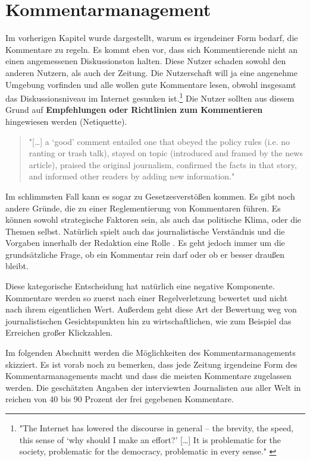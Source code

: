 \chapter{Kommentarmanagement}


Im vorherigen Kapitel wurde dargestellt, warum es irgendeiner Form bedarf, die
Kommentare zu regeln. Es kommt eben vor, dass sich Kommentierende nicht an einen
angemessenen Diskussionston halten. Diese Nutzer schaden sowohl den anderen
Nutzern, als auch der Zeitung. Die Nutzerschaft will ja eine angenehme Umgebung
vorfinden \autocite[S.~217]{meyer-carey} und alle wollen \glqq gute\grqq{}
Kommentare lesen, obwohl insgesamt das Diskussionsniveau im Internet gesunken
ist.\footnote{"The Internet has lowered the discourse in general – the brevity,
the speed, this sense of ‘why should I make an effort?' [\ldots] It is
problematic for the society, problematic for the democracy, problematic in every
sense." \autocite[S.~130]{singer}} Die Nutzer sollten aus diesem Grund auf
{\bfseries Empfehlungen oder Richtlinien zum Kommentieren} hingewiesen werden
(\glqq Netiquette\grqq).


\begin{quote}
"[\ldots] a `good' comment entailed one that obeyed the policy rules (i.e. no
ranting or trash talk), stayed on topic (introduced and framed by the news
article), praised the original journalism, confirmed the facts in that story,
and informed other readers by adding new information."
\autocite[S.~134]{robinson}
\end{quote}

Im schlimmsten Fall kann es sogar zu Gesetzesverstößen kommen. Es gibt noch
andere Gründe, die zu einer Reglementierung von Kommentaren führen. Es können
sowohl strategische Faktoren sein, als auch das politische Klima, oder die
Themen selbst. Natürlich spielt auch das journalistische Verständnis und die
Vorgaben innerhalb der Redaktion eine Rolle \autocite[S.~106f]{reich}. Es geht
jedoch immer um die grundsätzliche Frage, ob ein Kommentar \glqq rein\grqq{}
darf oder ob er besser \glqq draußen\grqq{}  bleibt.

Diese kategorische Entscheidung hat natürlich eine negative Komponente.
Kommentare werden so zuerst nach einer Regelverletzung bewertet und nicht nach
ihrem eigentlichen Wert. Außerdem geht diese Art der Bewertung weg von
journalistischen Gesichtspunkten hin zu wirtschaftlichen, wie zum Beispiel das
Erreichen großer Klickzahlen.

Im folgenden Abschnitt werden die Möglichkeiten des Kommentarmanagements
skizziert. Es ist vorab noch zu bemerken, dass jede Zeitung irgendeine Form des
Kommentarmanagements macht und dass die meisten Kommentare zugelassen werden.
Die geschätzten Angaben der interviewten Journalisten aus aller Welt in
\textcite[S.~106]{singer} reichen von 40 bis 90 Prozent der frei gegebenen
Kommentare.

